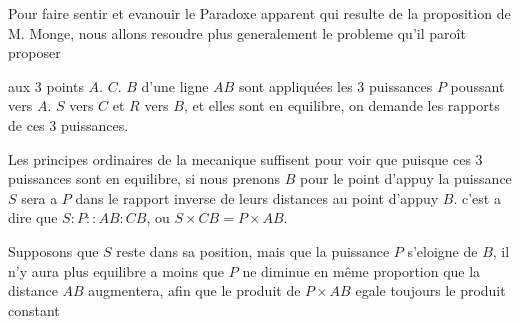 \documentclass[11pt,a4paper]{article}
\begin{document}
Pour faire sentir et evanouir le Paradoxe apparent qui resulte de la
proposition de M. Monge, nous allons resoudre plus generalement le probleme
qu'il paroît proposer


aux 3 points $A$. $C$. $B$ d'une ligne $AB$ sont appliquées les 3 puissances
$P$ poussant vers $A$. $S$ vers $C$ et $R$ vers $B$, et elles sont en
equilibre, on demande les rapports de ces 3 puissances.

Les principes ordinaires de la mecanique suffisent pour voir que puisque ces
3 puissances sont en equilibre, si nous prenons $B$ pour le point d'appuy la
puissance $S$ sera a $P$ dans le rapport inverse de leurs distances au point
d'appuy $B$. c'est a dire que $S : P :: AB : CB$, ou $S \times CB = P \times
AB$.


Supposons que $S$ reste dans sa position, mais que la puissance $P$ s'eloigne
de $B$, il n'y aura plus equilibre a moins que $P$ ne diminue en 
même proportion que la distance $AB$ augmentera, afin que le produit de $P
\times AB$ egale toujours le produit constant

\end{document}
